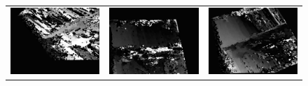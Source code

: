 \documentclass[11pt]{report}
\begin{document}
\begin{figure}[H]
  \centering
  \begin{tabular}{ccc}
    \includegraphics[scale=0.1]{images/disparity-opencv-t/disparity_10.png} &
    \includegraphics[scale=0.1]{images/disparity-opencv-d/disparity_10.png} &
    \includegraphics[scale=0.1]{images/disparity-opengv/disparity_10.png} \\

\end{tabular}
\end{figure}
\end{document}
